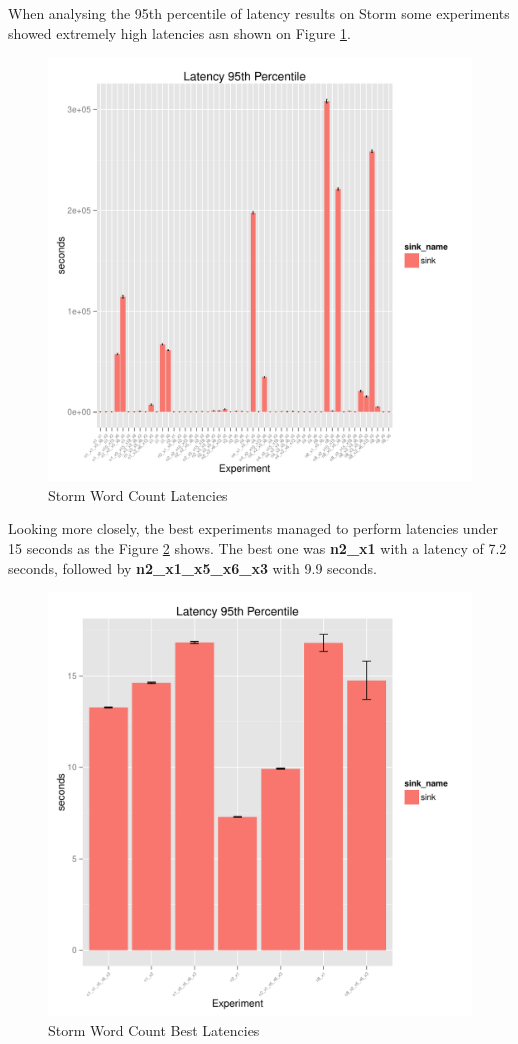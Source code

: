 \documentclass[ppgc,diss,english]{iiufrgs}
\begin{document}
When analysing the 95th percentile of latency results on Storm some experiments showed extremely high latencies asn shown on Figure \ref{fig:storm_wordcount_latency}.

\begin{figure}[H]
    \centering
	\includegraphics[width=.6\textwidth]{summaries/storm_wordcount/full_latency.pdf}
	\caption{Storm Word Count Latencies}
	\label{fig:storm_wordcount_latency}
\end{figure}

Looking more closely, the best experiments managed to perform latencies under 15 seconds as the Figure \ref{fig:storm_wordcount_latency_best} shows. The best one was \textbf{n2\_x1} with a latency of 7.2 seconds, followed by \textbf{n2\_x1\_x5\_x6\_x3} with 9.9 seconds.

\begin{figure}[H]
    \centering
	\includegraphics[width=.6\textwidth]{summaries/storm_wordcount/full_best_latency.pdf}
	\caption{Storm Word Count Best Latencies}
	\label{fig:storm_wordcount_latency_best}
\end{figure}
\end{document}
